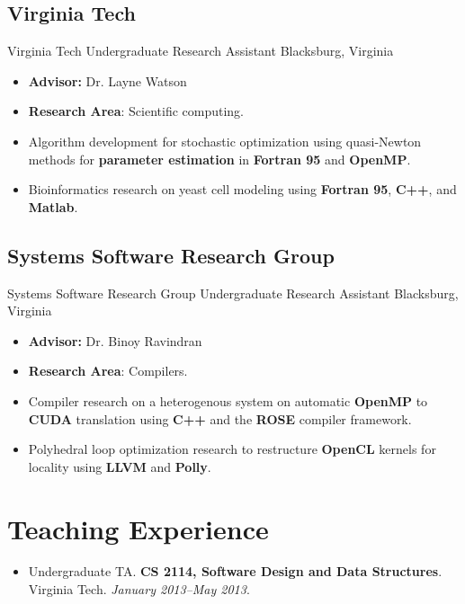 \documentclass[11pt,letter,sans]{moderncv}
\begin{document}
    \subsection{Virginia Tech}
      {Virginia Tech}%
      {Undergraduate Research Assistant}%
      {Blacksburg, Virginia}%
      {}%
      {
        \begin{itemize}
        \item {\bf Advisor:} Dr. Layne Watson\item {\bf Research Area}: Scientific computing.\item Algorithm development for stochastic optimization using quasi-Newton methods for {\bf parameter estimation} in {\bf Fortran 95} and {\bf OpenMP}.\item Bioinformatics research on yeast cell modeling using {\bf Fortran 95}, {\bf C++}, and {\bf Matlab}.\end{itemize}
      }
  
    \subsection{Systems Software Research Group}
      {Systems Software Research Group}%
      {Undergraduate Research Assistant}%
      {Blacksburg, Virginia}%
      {}%
      {
        \begin{itemize}
        \item {\bf Advisor:} Dr. Binoy Ravindran\item {\bf Research Area}: Compilers.\item Compiler research on a heterogenous system on automatic {\bf OpenMP} to {\bf CUDA} translation using {\bf C++} and the {\bf ROSE} compiler framework.\item Polyhedral loop optimization research to restructure {\bf OpenCL} kernels for locality using {\bf LLVM} and {\bf Polly}.\end{itemize}
      }
  
\section{ Teaching Experience }


  \begin{itemize}
    
      \item
        Undergraduate TA.
        {\bf CS 2114, Software Design and Data Structures}.
        Virginia Tech.
        {\it January 2013--May 2013}.
    
  \end{itemize}
\end{document}

